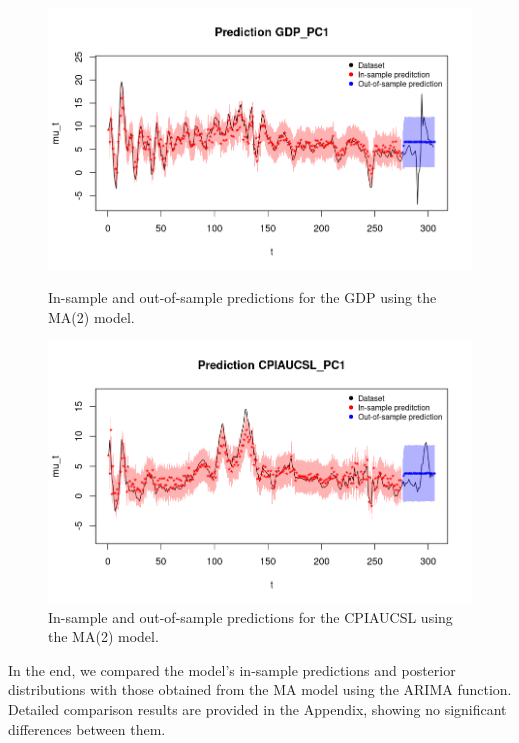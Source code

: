 \begin{figure}[H]
    \centering
    \begin{minipage}{0.49\textwidth}
        \centering
        \includegraphics[width=\textwidth]{images/3-MA/gdp_prediction2.png}
        \caption{In-sample and out-of-sample predictions for the GDP using the MA(2) model.}
        \label{fig:MA2_gdp_prediction}
    \end{minipage}\hfill
    \begin{minipage}{0.49\textwidth}
        \centering
        \includegraphics[width=\textwidth]{images/3-MA/infl_prediction2.png}
        \caption{In-sample and out-of-sample predictions for the CPIAUCSL using the MA(2) model.}
        \label{fig:MA2_infl_prediction}
    \end{minipage}
\end{figure}
In the end, we compared the model's in-sample predictions and posterior distributions with those obtained from the MA model using the ARIMA function. Detailed comparison results are provided in the Appendix, showing no significant differences between them.